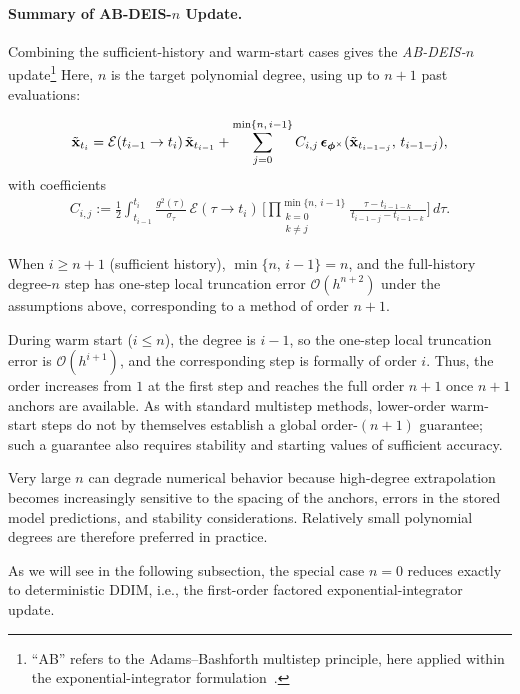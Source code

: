 \paragraph{Summary of AB-DEIS-$n$ Update.}
Combining the sufficient-history and warm-start cases gives the
\emph{AB-DEIS-$n$} update\footnote{``AB'' refers to the Adams--Bashforth
multistep principle, here applied within the exponential-integrator
formulation~\citep{hochbruck2010exponential}.} Here, $n$ is the target
polynomial degree, using up to $n{+}1$ past evaluations:
\begin{mdframed}
\begin{align*}
\tilde{{\mathbf{x}}}_{t_i}
= \mathcal{E}(t_{i-1} \to t_i)\,\tilde{{\mathbf{x}}}_{t_{i-1}}
+ \sum_{j=0}^{\min\{n,\, i-1\}} C_{i,j}\,{\bm{\epsilon}}_{\bm{\phi}^\times}(\tilde{{\mathbf{x}}}_{t_{i-1-j}},\,t_{i-1-j}),
\end{align*}
with coefficients
\begin{align*}
C_{i,j}
:= \frac{1}{2} \int_{t_{i-1}}^{t_i}
\frac{g^2(\tau)}{\sigma_\tau}\,\mathcal{E}(\tau \to t_i)\,
\Bigg[\prod_{\substack{k=0\\k\neq j}}^{\min\{n,\, i-1\}}
\frac{\tau - t_{i-1-k}}{\,t_{i-1-j} - t_{i-1-k}\,}\Bigg]\,d\tau.
\end{align*}
\end{mdframed}

When $i\ge n{+}1$ (sufficient history), $\min\{n,\,i-1\}=n$, and the
full-history degree-$n$ step has one-step local truncation error
$\mathcal O(h^{n+2})$ under the assumptions above, corresponding
to a method of order $n+1$.

During warm start ($i\le n$), the degree is $i-1$, so the
one-step local truncation error is $\mathcal O(h^{i+1})$, and the corresponding
step is formally of order $i$. Thus, the order increases from $1$ at the first
step and reaches the full order $n+1$ once $n+1$ anchors are available.
As with standard multistep methods, lower-order warm-start steps do not by
themselves establish a global order-$(n+1)$ guarantee; such a guarantee also
requires stability and starting values of sufficient accuracy.

Very large $n$ can degrade numerical behavior because high-degree
extrapolation becomes increasingly sensitive to the spacing of the anchors,
errors in the stored model predictions, and stability considerations.
Relatively small polynomial degrees are therefore preferred in practice.

As we will see in the following subsection, the special case $n{=}0$ reduces
exactly to deterministic DDIM, i.e., the first-order factored
exponential-integrator update.
